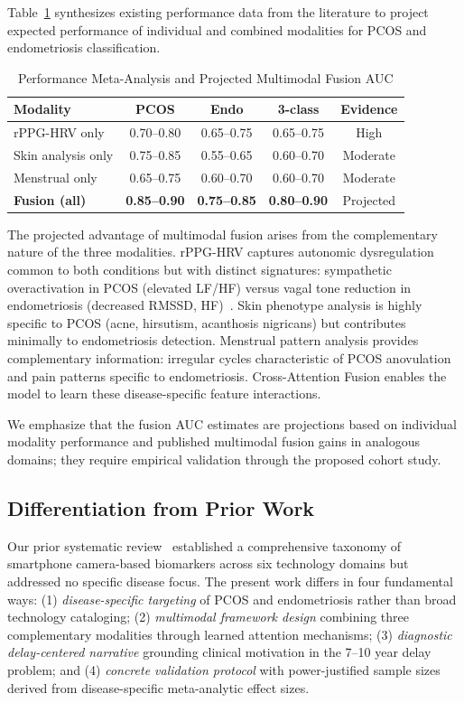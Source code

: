 \documentclass[conference]{IEEEtran}
\begin{document}
Table~\ref{tab:meta} synthesizes existing performance data from the literature to project expected performance of individual and combined modalities for PCOS and endometriosis classification.

\begin{table}[t]
\centering
\caption{Performance Meta-Analysis and Projected Multimodal Fusion AUC}
\label{tab:meta}
\begin{tabular}{lcccc}
\toprule
\textbf{Modality} & \textbf{PCOS} & \textbf{Endo} & \textbf{3-class} & \textbf{Evidence} \\
\midrule
rPPG-HRV only & 0.70--0.80 & 0.65--0.75 & 0.65--0.75 & High \\
Skin analysis only & 0.75--0.85 & 0.55--0.65 & 0.60--0.70 & Moderate \\
Menstrual only & 0.65--0.75 & 0.60--0.70 & 0.60--0.70 & Moderate \\
\textbf{Fusion (all)} & \textbf{0.85--0.90} & \textbf{0.75--0.85} & \textbf{0.80--0.90} & Projected \\
\bottomrule
\end{tabular}
\end{table}

The projected advantage of multimodal fusion arises from the complementary nature of the three modalities. rPPG-HRV captures autonomic dysregulation common to both conditions but with distinct signatures: sympathetic overactivation in PCOS (elevated LF/HF) versus vagal tone reduction in endometriosis (decreased RMSSD, HF)~\cite{Mirzohreh_2024, Hao_2021}. Skin phenotype analysis is highly specific to PCOS (acne, hirsutism, acanthosis nigricans) but contributes minimally to endometriosis detection. Menstrual pattern analysis provides complementary information: irregular cycles characteristic of PCOS anovulation and pain patterns specific to endometriosis. Cross-Attention Fusion enables the model to learn these disease-specific feature interactions.

We emphasize that the fusion AUC estimates are projections based on individual modality performance and published multimodal fusion gains in analogous domains; they require empirical validation through the proposed cohort study.

\subsection{Differentiation from Prior Work}

Our prior systematic review~\cite{debnath2025comprehensive, rppgreview2024frontiers} established a comprehensive taxonomy of smartphone camera-based biomarkers across six technology domains but addressed no specific disease focus. The present work differs in four fundamental ways: (1) \textit{disease-specific targeting} of PCOS and endometriosis rather than broad technology cataloging; (2) \textit{multimodal framework design} combining three complementary modalities through learned attention mechanisms; (3) \textit{diagnostic delay-centered narrative} grounding clinical motivation in the 7--10 year delay problem; and (4) \textit{concrete validation protocol} with power-justified sample sizes derived from disease-specific meta-analytic effect sizes.
\end{document}
